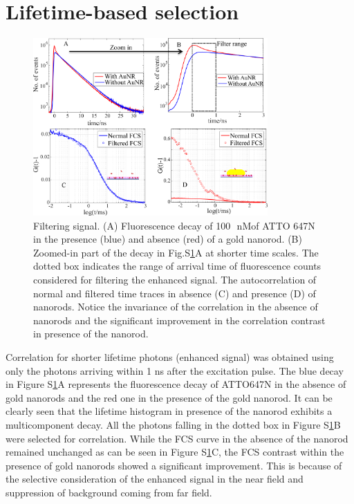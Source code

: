 \documentclass[11pt,a4paper,onecolumn]{article}
\newcommand{\nM}{\ensuremath{\,\textrm{nM}}}
\begin{document}
\section{Lifetime-based selection}
\begin{figure}[ht]
  \centering
  \includegraphics[width=0.8\textwidth]{lifetime_filtering.png}
  \makeatletter
  \renewcommand{\fnum@figure}{\figurename~S\thefigure}
  \makeatother{}
  \caption{Filtering signal. (A) Fluorescence decay of 100~\nM of ATTO 647N in the presence (blue) and absence (red) of a gold nanorod. (B) Zoomed-in part of the decay in Fig.S\ref{SIfig:lifetime-filtering}A at shorter time scales. The dotted box indicates the range of arrival time of fluorescence counts considered for filtering the enhanced signal. The autocorrelation of normal and filtered time traces in absence (C) and presence (D) of nanorods. Notice the invariance of the correlation in the absence of nanorods and the significant improvement in the correlation contrast in presence of the nanorod.}
  \label{SIfig:lifetime-filtering}
\end{figure}
Correlation for shorter lifetime photons (enhanced signal) was obtained using only the photons arriving within 1 ns after the excitation pulse. The blue decay in Figure S\ref{SIfig:lifetime-filtering}A represents the fluorescence decay of ATTO647N in the absence of gold nanorods and the red one in the presence of the gold nanorod. It can be clearly seen that the lifetime histogram in presence of the nanorod exhibits a multicomponent decay. All the photons falling in the dotted box in Figure S\ref{SIfig:lifetime-filtering}B were selected for correlation. While the FCS curve in the absence of the nanorod remained unchanged as can be seen in Figure S\ref{SIfig:lifetime-filtering}C, the FCS contrast within the presence of gold nanorods showed a significant improvement. This is because of the selective consideration of the enhanced signal in the near field and suppression of background coming from far field.
\end{document}
